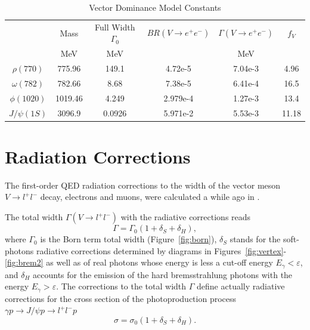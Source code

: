 \documentclass[prd,onecolumn,showpcs,amsmath,amssymb,nofootinbib,notitlepage,preprintnumbers,balancelastpage,longbibliography]{revtex4-2}
\begin{document}
\begin{table}[h!]
\centering
\caption{Vector Dominance Model Constants }
\begin{tabular}{|c|c|c|c|c|c|}
\hline
                      & Mass& Full Width $ \Gamma_0$ & $BR(V\to e^+e^-)$ & $\Gamma(V\to e^+e^-)$ & $f_V$ \\
                      & MeV & MeV                                 &                      & MeV                              &          \\
\hline
\hline
$\rho(770)$     & 775.96 & 149.1                                & 4.72e-5                  & 7.04e-3 & 4.96 \\
\hline
$\omega(782)$ &782.66 & 8.68                                &   7.38e-5               &  6.41e-4& 16.5 \\
\hline
$\phi(1020)$    & 1019.46 & 4.249                                & 2.979e-4                & 1.27e-3 & 13.4 \\
\hline
$J/\psi(1S)$ & 3096.9 & 0.0926                               & 5.971e-2                  & 5.53e-3 & 11.18 \\
\hline
\end{tabular}
\label{Table:1}
\end{table}


\section{Radiation Corrections}
The first-order QED  radiation corrections to the width of the vector meson $V\to l^+l^-$ decay, electrons and muons, were calculated a while ago in \cite{Ehlotzky1968}.

The total width $\Gamma(V \to l^+l^-)$ with the radiative corrections reads
\begin{equation}
\Gamma = \Gamma_0(1+\delta_S+\delta_H),
\end{equation}
\noindent
where $\Gamma_0$ is the Born term total width (Figure~\ref{fig:born}),  $\delta_S$ stands for the soft-photons radiative corrections determined by diagrams in Figures~\ref{fig:vertex}-\ref{fig:brem2} as well as of real photons whose energy is less a cut-off energy ${E_\gamma<\varepsilon}$, 
and  $\delta_H$ accounts for the emission of the hard bremsstrahlung photons with the energy  ${E_\gamma>\varepsilon}$. The corrections to the total width 
$\Gamma$ define actually radiative corrections for the cross section of the photoproduction process
$\gamma p \to J/\psi p \to l^+l^- p$
\begin{equation}
\sigma = \sigma_0(1+\delta_S+\delta_H).
\end{equation}
\noindent
\end{document}
